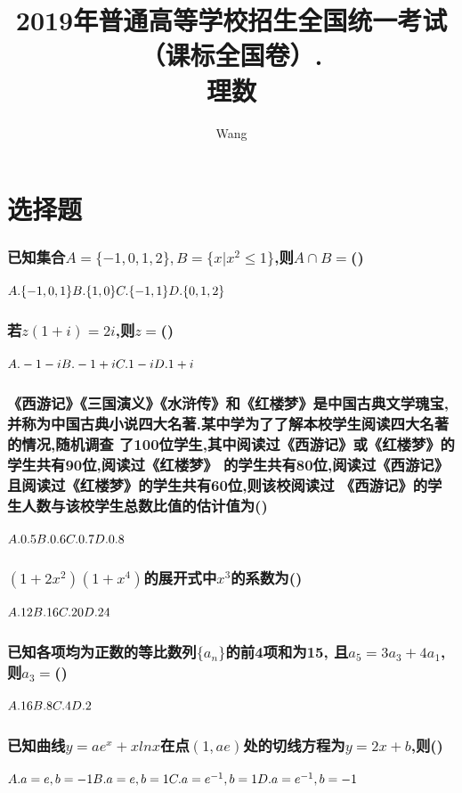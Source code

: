 \documentclass[UTF8]{ctexart}
\begin{document}
\title{2019年普通高等学校招生全国统一考试
    （课标全国卷\uppercase\expandafter{}）.\\
    \textbf{理数}}
\author{Wang}
\maketitle

\section{选择题}

\subsubsection{已知集合$A=\{-1,0,1,2\},B=\{x|x^2\leq 1\}$,则$A\cap B=$\hfill (\qquad)}
$A.\{-1,0,1\}\hfill B.\{1,0\}\hfill C.\{-1,1\}\hfill D.\{0,1,2\}$

\subsubsection{若$z(1+i)=2i$,则$z=$\hfill (\qquad)}
$A. -1-i\hfill B. -1+i\hfill C. 1-i\hfill D. 1+i$

\subsubsection{《西游记》《三国演义》《水浒传》和《红楼梦》是中国古典文学瑰宝,
    并称为中国古典小说四大名著.某中学为了了解本校学生阅读四大名著的情况,随机调查
    了100位学生,其中阅读过《西游记》或《红楼梦》的学生共有90位,阅读过《红楼梦》
    的学生共有80位,阅读过《西游记》且阅读过《红楼梦》的学生共有60位,则该校阅读过
    《西游记》的学生人数与该校学生总数比值的估计值为\hfill (\qquad)}
$A. 0.5\hfill B. 0.6\hfill C. 0.7\hfill D. 0.8$

\subsubsection{$(1+2x^2)(1+x^4)$的展开式中$x^3$的系数为\hfill (\qquad)}
$A. 12\hfill B. 16\hfill C. 20\hfill D. 24$

\subsubsection{已知各项均为正数的等比数列$\{a_n\}$的前4项和为15,
    且$a_5=3a_3+4a_1$,则$a_3=$\hfill (\qquad)}
$A. 16\hfill B. 8\hfill C. 4\hfill D. 2$

\subsubsection{已知曲线$y=ae^x+xlnx$在点$(1,ae)$处的切线方程为$y=2x+b$,则\hfill (\qquad)}
$A. a=e,b=-1 \hfill B. a=e,b=1\hfill C. a=e^{-1},b=1\hfill D. a=e^{-1},b=-1$
\end{document}
